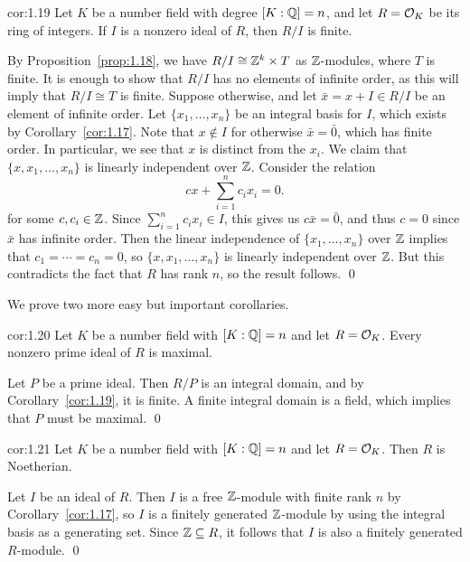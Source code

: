 \begin{cor}{cor:1.19}
    Let $K$ be a number field with degree $[K : \mathbb{Q}] = n$, and let 
    $R = {\cal O}_K$ be its ring of integers. 
    If $I$ is a nonzero ideal of $R$, then $R/I$ is finite. 
\end{cor}\vspace{-0.25cm}
\begin{pf}
    By Proposition~\ref{prop:1.18}, we have $R/I \cong \mathbb{Z}^k \times T$ 
    as $\mathbb{Z}$-modules, where $T$ is finite. It is enough to show that 
    $R/I$ has no elements of infinite order, as this will imply that 
    $R/I \cong T$ is finite. Suppose otherwise, and let $\bar{x} = 
    x + I \in R/I$ be an element of infinite order. Let $\{x_1, \dots, x_n\}$
    be an integral basis for $I$, which exists by Corollary~\ref{cor:1.17}. 
    Note that $x \notin I$ for otherwise $\bar{x} = \bar{0}$, which has 
    finite order. In particular, we see that $x$ is distinct from 
    the $x_i$. We claim that $\{x, x_1, \dots, x_n\}$ is linearly independent 
    over $\mathbb{Z}$. Consider the relation 
    \[ cx + \sum_{i=1}^n c_i x_i = 0. \] 
    for some $c, c_i \in \mathbb{Z}$. Since $\sum_{i=1}^n c_i x_i \in I$, this gives 
    us $c\bar{x} = \bar{0}$, and thus $c = 0$ since $\bar{x}$ has infinite 
    order. Then the linear independence of $\{x_1, \dots, x_n\}$ over $\mathbb{Z}$ 
    implies that $c_1 = \cdots = c_n = 0$, so $\{x, x_1, \dots, x_n\}$ 
    is linearly independent over $\mathbb{Z}$. But this contradicts the fact that $R$ 
    has rank $n$, so the result follows. \qed
\end{pf}\vspace{-0.25cm}

We prove two more easy but important corollaries. 

\begin{cor}{cor:1.20}
    Let $K$ be a number field with $[K : \mathbb{Q}] = n$ and let $R = {\cal O}_K$. 
    Every nonzero prime ideal of $R$ is maximal.
\end{cor}\vspace{-0.25cm}
\begin{pf}
    Let $P$ be a prime ideal. Then $R/P$ is an integral domain, and by 
    Corollary~\ref{cor:1.19}, it is finite. A finite integral 
    domain is a field, which implies that $P$ must be maximal. \qed
\end{pf}\vspace{-0.15cm}

\begin{cor}{cor:1.21}
    Let $K$ be a number field with $[K : \mathbb{Q}] = n$ and let $R = {\cal O}_K$. 
    Then $R$ is Noetherian. 
\end{cor}\vspace{-0.25cm}
\begin{pf}
    Let $I$ be an ideal of $R$. Then $I$ is a free $\mathbb{Z}$-module with 
    finite rank $n$ by Corollary~\ref{cor:1.17}, so $I$ is a finitely 
    generated $\mathbb{Z}$-module by using the integral basis as a generating set. 
    Since $\mathbb{Z} \subseteq R$, it follows that $I$ is also a finitely 
    generated $R$-module. \qed
\end{pf}